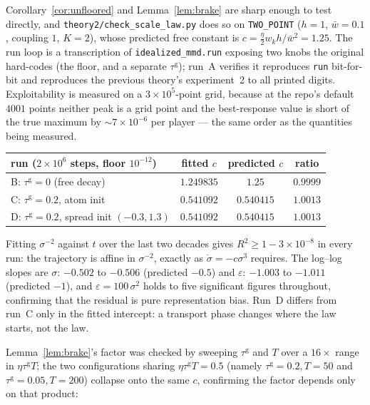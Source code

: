 \documentclass[11pt]{article}
\theoremstyle{definition}
\begin{document}
Corollary~\ref{cor:unfloored} and Lemma~\ref{lem:brake} are sharp enough to test
directly, and \texttt{theory2/check\_scale\_law.py} does so on
\texttt{TWO\_POINT} ($h = 1$, $\bar w = 0.1$, coupling $1$, $K = 2$), whose
predicted free constant is $c = \tfrac{\eta}{2} w_k h/\bar w^2 = 1.25$. The run
loop is a transcription of \texttt{idealized\_mmd.run} exposing two knobs the
original hard-codes (the floor, and a separate $\tau^{\mathrm g}$); run~A
verifies it reproduces \texttt{run} bit-for-bit and reproduces the previous
theory's experiment~2 to all printed digits. Exploitability is measured on a
$3\times10^5$-point grid, because at the repo's default $4001$ points neither
peak is a grid point and the best-response value is short of the true maximum by
$\sim 7\times10^{-6}$ per player --- the same order as the quantities being
measured.

\begin{center}
\begin{tabular}{lccc}
\hline
run ($2\times 10^6$ steps, floor $10^{-12}$) & fitted $c$ & predicted $c$ &
  ratio\\
\hline
B: $\tau^{\mathrm g} = 0$ (free decay) & $1.249835$ & $1.25$ & $0.9999$\\
C: $\tau^{\mathrm g} = 0.2$, atom init & $0.541092$ & $0.540415$ & $1.0013$\\
D: $\tau^{\mathrm g} = 0.2$, spread init $(-0.3, 1.3)$ & $0.541092$ &
  $0.540415$ & $1.0013$\\
\hline
\end{tabular}
\end{center}

\noindent Fitting $\sigma^{-2}$ against $t$ over the last two decades gives
$R^2 \ge 1 - 3\times10^{-8}$ in every run: the trajectory is affine in
$\sigma^{-2}$, exactly as $\dot\sigma = -c\sigma^3$ requires. The log--log slopes
are $\sigma$: $-0.502$ to $-0.506$ (predicted $-0.5$) and $\varepsilon$:
$-1.003$ to $-1.011$ (predicted $-1$), and $\varepsilon = 100\,\sigma^2$ holds to
five significant figures throughout, confirming that the residual is pure
representation bias. Run~D differs from run~C only in the fitted intercept: a
transport phase changes where the law starts, not the law.

Lemma~\ref{lem:brake}'s factor was checked by sweeping $\tau^{\mathrm g}$ and $T$
over a $16\times$ range in $\eta\tau^{\mathrm g}T$; the two configurations sharing
$\eta\tau^{\mathrm g}T = 0.5$ (namely $\tau^{\mathrm g}=0.2, T=50$ and
$\tau^{\mathrm g}=0.05, T=200$) collapse onto the same $c$, confirming the factor
depends only on that product:
\end{document}

